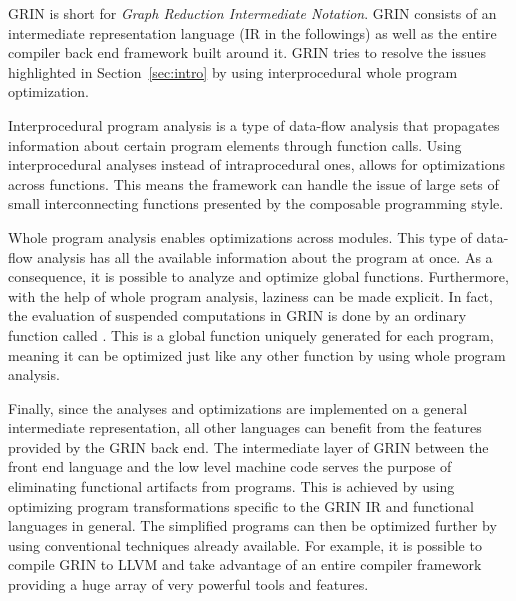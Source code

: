 \documentclass[main.tex]{subfiles}
\begin{document}
	
	GRIN is short for \emph{Graph Reduction Intermediate Notation}. GRIN consists of an intermediate representation language (IR in the followings) as well as the entire compiler back end framework built around it. GRIN tries to resolve the issues highlighted in Section~\ref{sec:intro} by using interprocedural whole program optimization. 
	
	Interprocedural program analysis is a type of data-flow analysis that propagates information about certain program elements through function calls. Using interprocedural analyses instead of intraprocedural ones, allows for optimizations across functions. This means the framework can handle the issue of large sets of small interconnecting functions presented by the composable programming style. 
	
	Whole program analysis enables optimizations across modules. This type of data-flow analysis has all the available information about the program at once. As a consequence, it is possible to analyze and optimize global functions. Furthermore, with the help of whole program analysis, laziness can be made explicit. In fact, the evaluation of suspended computations in GRIN is done by an ordinary function called . This is a global function uniquely generated for each program, meaning it can be optimized just like any other function by using whole program analysis. 
	
	Finally, since the analyses and optimizations are implemented on a general intermediate representation, all other languages can benefit from the features provided by the GRIN back end. The intermediate layer of GRIN between the front end language and the low level machine code serves the purpose of eliminating functional artifacts from programs. This is achieved by using optimizing program transformations specific to the GRIN IR and functional languages in general. The simplified programs can then be optimized further by using conventional techniques already available. For example, it is possible to compile GRIN to LLVM and take advantage of an entire compiler framework providing a huge array of very powerful tools and features.
	
	
\end{document}
